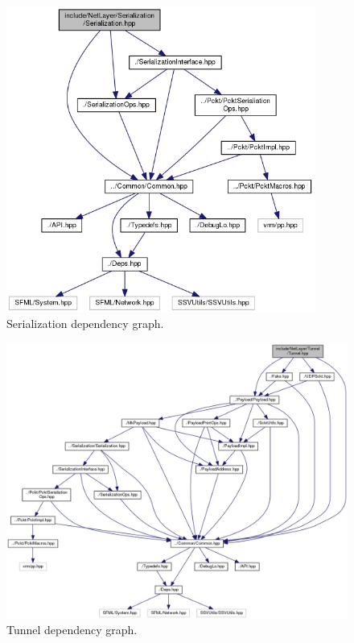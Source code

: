\documentclass[12pt]{report}
\newcommand{\+}{\discretionary{\mbox{\scriptsize$\hookleftarrow$}}{}{}}
\begin{document}
\begin{figure}[!htb]
\caption{Serialization dependency graph.}
\centering
\includegraphics[width=0.9\textwidth]{inc/dep_ser.png}
\end{figure}

\begin{figure}[!htb]
\caption{Tunnel dependency graph.}
\centering
\includegraphics[width=1\textwidth]{inc/dep_tunnel.png}
\end{figure}
\end{document}
